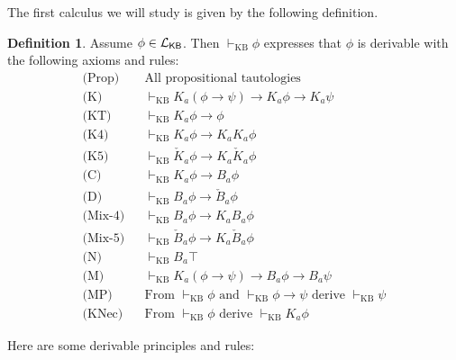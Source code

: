 \documentclass[12pt]{article}
\theoremstyle{definition}
\newtheorem{definition}[theorem]{Definition}
\newcommand{\Lang}{{\cal L}}   %
\newcommand{\KB}{{\mathsf{KB}}}                     %
\begin{document}
The first calculus we will study is given by the following definition. 

\begin{definition} Assume $\phi \in \Lang_\KB$.  Then $\vdash_{\text{KB}} \phi$
  expresses that $\phi$ is derivable with the following axioms and
  rules:
\begin{eqnarray*}
\text{(Prop)} & & \text{All propositional tautologies} \\
\text{(K)} & & \vdash_{\text{KB}} K_a(\phi \rightarrow \psi) \rightarrow K_a \phi \rightarrow K_a\psi \\
\text{(KT)} & & \vdash_{\text{KB}} K_a \phi \rightarrow \phi \\
\text{(K4)} & & \vdash_{\text{KB}} K_a \phi \rightarrow  K_a  K_a \phi \\
\text{(K5)} & & \vdash_{\text{KB}} \check{K}_a \phi \rightarrow  K_a  \check{K}_a \phi \\
\text{(C)} & & \vdash_{\text{KB}} K_a \phi \rightarrow B_a \phi \\
\text{(D)} & &  \vdash_{\text{KB}} B_a \phi \rightarrow \check{B}_a \phi \\
\text{(Mix-4)} & & \vdash_{\text{KB}} B_a \phi \rightarrow K_a B_a \phi \\
\text{(Mix-5)} & & \vdash_{\text{KB}} \check{B}_a \phi \rightarrow K_a \check{B}_a \phi \\
\text{(N)} & & \vdash_{\text{KB}} B_a \top \\
\text{(M)} & &  \vdash_{\text{KB}}  K_a (\phi \rightarrow \psi) \rightarrow B_a \phi 
   \rightarrow B_a \psi  \\
\text{(MP)}  & &  \text{From } \vdash_{\text{KB}} \phi \text{ and } \vdash_{\text{KB}} \phi \rightarrow \psi 
   \text{ derive } \vdash_{\text{KB}} \psi \\ 
\text{(KNec)}  & & \text{From } \vdash_{\text{KB}} \phi 
        \text{ derive } \vdash_{\text{KB}} K_a \phi 
\end{eqnarray*} 
\end{definition}

Here are some derivable principles and rules: 
\end{document}

